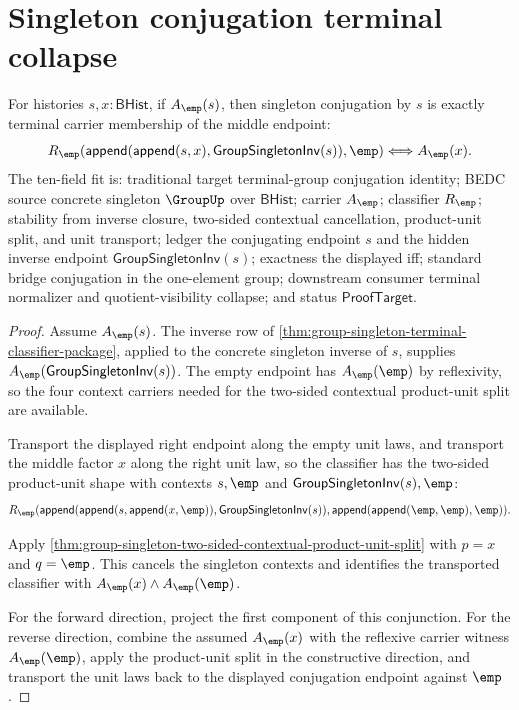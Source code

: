 \section{Singleton conjugation terminal collapse}
\label{sec:group-singleton-conjugation-terminal-collapse}

\begin{theorem}
\label{thm:group-singleton-conjugation-terminal-collapse}
For histories $s,x:\mathsf{BHist}$, if $A_{\emp}(s)$, then singleton
conjugation by $s$ is exactly terminal carrier membership of the middle
endpoint:
$$
R_{\emp}(\mathsf{append}(\mathsf{append}(s,x),\mathsf{GroupSingletonInv}(s)),\emp)
\Longleftrightarrow A_{\emp}(x).
$$
The ten-field fit is: traditional target terminal-group conjugation identity;
BEDC source concrete singleton $\GroupUp$ over $\mathsf{BHist}$; carrier
$A_{\emp}$; classifier $R_{\emp}$; stability from inverse closure, two-sided
contextual cancellation, product-unit split, and unit transport; ledger the
conjugating endpoint $s$ and the hidden inverse endpoint
$\mathsf{GroupSingletonInv}(s)$; exactness the displayed iff; standard bridge
conjugation in the one-element group; downstream consumer terminal normalizer
and quotient-visibility collapse; and status $\mathsf{ProofTarget}$.
\end{theorem}
\begin{proof}
Assume $A_{\emp}(s)$. The inverse row of
\autoref{thm:group-singleton-terminal-classifier-package}, applied to the
concrete singleton inverse of $s$, supplies
$A_{\emp}(\mathsf{GroupSingletonInv}(s))$. The empty endpoint has
$A_{\emp}(\emp)$ by reflexivity, so the four context carriers needed for the
two-sided contextual product-unit split are available.

Transport the displayed right endpoint along the empty unit laws, and transport
the middle factor $x$ along the right unit law, so the classifier has the
two-sided product-unit shape with contexts $s,\emp$ and
$\mathsf{GroupSingletonInv}(s),\emp$:
$$
R_{\emp}(\mathsf{append}(\mathsf{append}(s,\mathsf{append}(x,\emp)),
\mathsf{GroupSingletonInv}(s)),\mathsf{append}(\mathsf{append}(\emp,\emp),\emp)).
$$

Apply \autoref{thm:group-singleton-two-sided-contextual-product-unit-split} with
$p=x$ and $q=\emp$. This cancels the singleton contexts and identifies the
transported classifier with $A_{\emp}(x)\land A_{\emp}(\emp)$.

For the forward direction, project the first component of this conjunction. For
the reverse direction, combine the assumed $A_{\emp}(x)$ with the reflexive
carrier witness $A_{\emp}(\emp)$, apply the product-unit split in the
constructive direction, and transport the unit laws back to the displayed
conjugation endpoint against $\emp$.
\end{proof}
